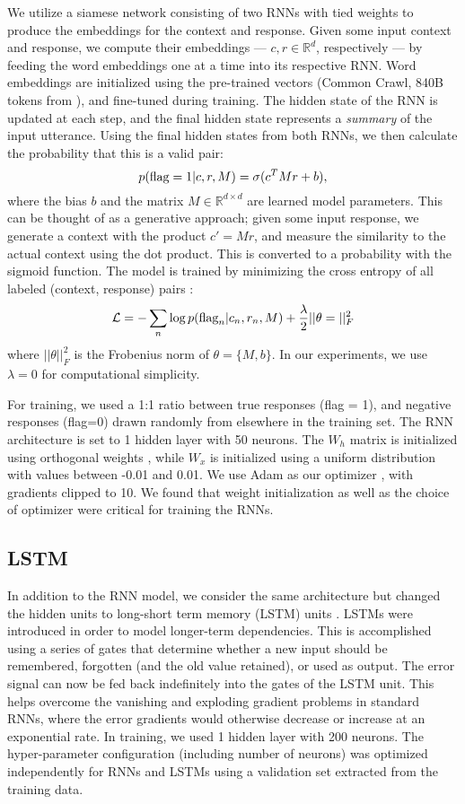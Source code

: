 \documentclass[11pt,a4paper]{article}
\begin{document}
We utilize a siamese network consisting of two RNNs with tied weights to produce the embeddings for the context and response. Given some input context and response, we compute their embeddings --- $c, r \in \mathbb{R}^d$, respectively --- by feeding the word embeddings one at a time into its respective RNN. Word embeddings are initialized using the pre-trained vectors (Common Crawl, 840B tokens from \cite{Pennington2014}), and fine-tuned during training. The hidden state of the RNN is updated at each step, and the final hidden state represents a \emph{summary} of the input utterance. Using the final hidden states from both RNNs, we then calculate the probability that this is a valid pair:
$$
p(\textmd{flag}=1|c,r,M) = \sigma(c^T M r + b),
$$
where the bias $b$ and the matrix $M \in \mathbb{R}^{d\times d}$ are learned model parameters. This can be thought of as a generative approach; given some input response, we generate a context with the product $c' = Mr$, and measure the similarity to the actual context using the dot product. This is converted to a probability with the sigmoid function. The model is trained by minimizing the cross entropy of all labeled (context, response) pairs \cite{yu2014deep}:
$$
\mathcal{L} = - \sum_n \log p(\textmd{flag}_n|c_n,r_n,M) + \frac{\lambda}{2}||\theta=||_F^2
$$
where $||\theta||_F^2$ is the Frobenius norm of $\theta = \{M,b\}$. In our experiments, we use $\lambda=0$ for computational simplicity.

For training, we used a 1:1 ratio between true responses (flag = 1), and negative responses (flag=0) drawn randomly from elsewhere in the training set. The RNN architecture is set to 1 hidden layer with 50 neurons. The $W_{h}$ matrix is initialized using orthogonal weights \cite{saxe2013exact}, while $W_{x}$ is initialized using a uniform distribution with values between -0.01 and 0.01. We use Adam as our optimizer \cite{DBLP:journals/corr/KingmaB14}, with gradients clipped to 10. We found that weight initialization as well as the choice of optimizer were critical for training the RNNs.



\subsection{LSTM}

In addition to the RNN model, we consider the same architecture but changed the hidden units to long-short term memory (LSTM) units \cite{hochreiter1997long}. LSTMs were introduced in order to model longer-term dependencies. This is accomplished using a series of gates that determine whether a new input should be remembered, forgotten (and the old value retained), or used as output. The error signal can now be fed back indefinitely into the gates of the LSTM unit. This helps overcome the vanishing and exploding gradient problems in standard RNNs, where the error gradients would otherwise decrease or increase at an exponential rate. In training, we used 1 hidden layer with 200 neurons.  The hyper-parameter configuration (including number of neurons) was optimized independently for RNNs and LSTMs using a validation set extracted from the training data.
\end{document}
